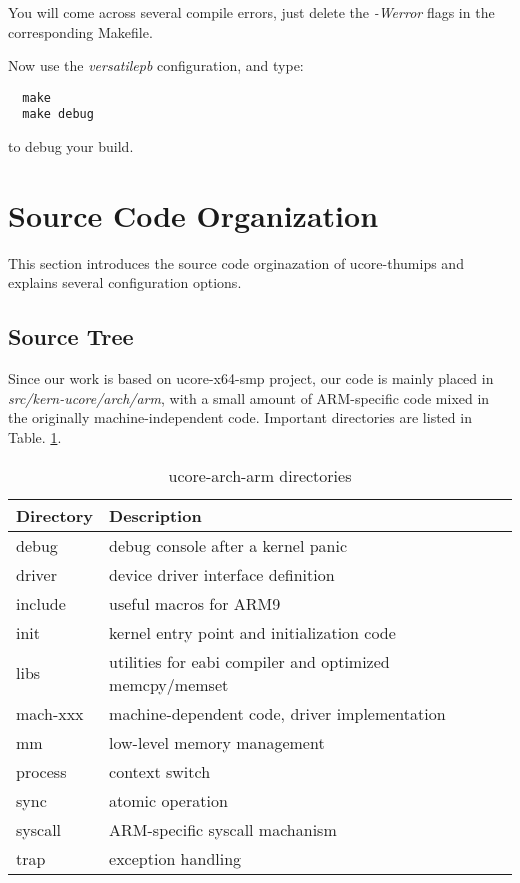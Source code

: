 \documentclass[a4paper]{article}
\begin{document}
You will come across several compile errors, just
delete the \emph{-Werror} flags in the corresponding Makefile.

Now use the \emph{versatilepb} configuration, and type:
\begin{verbatim}
  make 
  make debug
\end{verbatim}

to debug your build.


\section{Source Code Organization}
This section introduces the source code orginazation of ucore-thumips
and explains several configuration options.
\subsection{Source Tree}
Since our work is based on ucore-x64-smp project, our code is mainly placed
in \emph{src/kern-ucore/arch/arm}, with a small amount of ARM-specific 
code mixed in the originally machine-independent code. Important directories are listed in Table. \ref{tab:dir}.

\begin{table}[h]
  \centering
  \begin{tabular}{|l|l|}
    \hline
    Directory & Description \\
    \hline
    debug  &     debug console after a kernel panic \\
    driver &     device driver interface definition \\
    include &    useful macros for ARM9              \\
    init   &     kernel entry point and initialization code \\
    libs   &     utilities for eabi compiler and optimized memcpy/memset \\
    mach-xxx &   machine-dependent code, driver implementation \\
    mm     &     low-level memory management \\
    process   &  context switch             \\
    sync   &     atomic operation           \\
    syscall &     ARM-specific syscall machanism \\
    trap   &     exception handling  \\
    \hline
  \end{tabular}
  \caption{ucore-arch-arm directories}
  \label{tab:dir}
\end{table}
\end{document}
